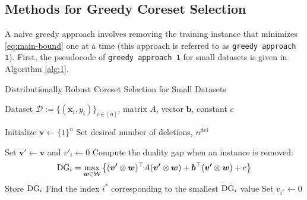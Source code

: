 \subsection{Methods for Greedy Coreset Selection} \label{app:algorithm}

%
A naive greedy approach involves removing the training instance that minimizes \eqref{eq:main-bound} one at a time (this approach is referred to as {\tt greedy approach 1}).
%
First, the pseudocode of {\tt greedy approach 1} for small datasets is given in Algorithm \ref{alg:1}.
%
\begin{algorithm}[H]
  \renewcommand{\algorithmicrequire}{\textbf{Input:}}
  \renewcommand{\algorithmicensure}{\textbf{Output:}}
  \caption{Distributionally Robust Coreset Selection for Small Datasets}
  \label{alg:1}
  \begin{algorithmic}[1]
      \Require Dataset ${\mathcal D} := \{(\bm x_i, y_i)\}_{i \in [n]}$, matrix $A$, vector $\bm b$, constant $c$

      \State Initialize $\boldsymbol{v} \gets \{1\}^n$
      \State Set desired number of deletions, $n^\mathrm{del}$

              \State Set $\boldsymbol{v'} \gets \boldsymbol{v}$ and $v'_i \gets 0$ 
              \State Compute the duality gap when an instance is removed:
              \[
              {\rm DG}_i = \max_{\boldsymbol{w} \in \mathcal{W}} \left\{(\boldsymbol{v'} \otimes \boldsymbol{w})^\top A (\boldsymbol{v'} \otimes \boldsymbol{w}) + \bm b^\top (\boldsymbol{v'} \otimes \boldsymbol{w}) + c \right\}
              \]
              \State Store ${\rm DG}_i$
          \EndFor
          \State Find the index $i^*$ corresponding to the smallest ${\rm DG}_i$ value
          \State Set $v_{i^*} \gets 0$ 


\end{algorithmic}
\end{algorithm}
